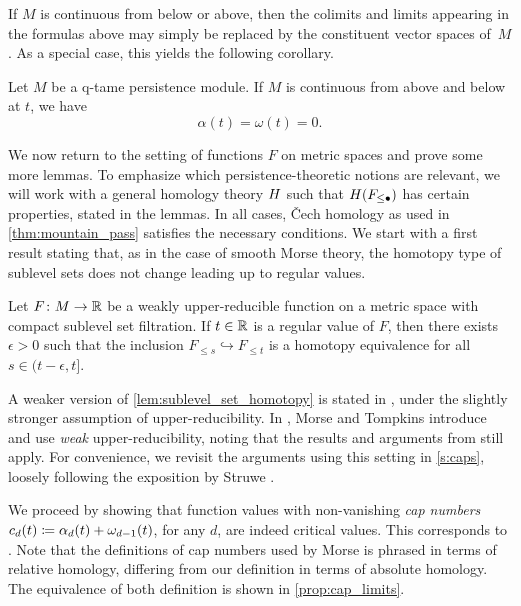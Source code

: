 If $M$ is continuous from below or above, then the colimits and limits appearing in the formulas above may simply be replaced by the constituent vector spaces of~$M$.
As a special case, this yields the following corollary.

\begin{cor}
\label{cor:regular_value_no_endpoint}
	Let $M$ be a q-tame persistence module.
	If $M$ is continuous from above and below at $t$, we have
	\[
		\alpha(t) = \omega(t) = 0.
	\]
\end{cor}

We now return to the setting of functions $F$ on metric spaces and prove some more lemmas.
To emphasize which persistence-theoretic notions are relevant, we will work with a general homology theory $H$ such that $H(F_{\leq \bullet})$ has certain properties, stated in the lemmas.
In all cases, \v{C}ech homology as used in \cref{thm:mountain_pass} satisfies the necessary conditions.
We start with a first result stating that, as in the case of smooth Morse theory, the homotopy type of sublevel sets does not change leading up to regular values.

\begin{lem}\label{lem:sublevel_set_homotopy}
	Let $F \colon M \to \mathbb{R}$ be a weakly upper-reducible function on a metric space with compact sublevel set filtration.
	If $t \in \mathbb{R}$ is a regular value of $F$, then there exists $\epsilon > 0$ such that the inclusion $F_{\leq s} \hookrightarrow F_{\leq t}$ is a homotopy equivalence for all $s \in (t - \epsilon, t]$.
\end{lem}

A weaker version of \cref{lem:sublevel_set_homotopy} is stated in \cite[Lemma 8.1]{Morse.1938}, under the slightly stronger assumption of upper-reducibility.
In \cite{Morse.1939}, Morse and Tompkins introduce and use \emph{weak} upper-reducibility, noting that the results and arguments from \cite[Sections 7 and 8]{Morse.1938} still apply.
For convenience, we revisit the arguments using this setting in \cref{s:caps}, loosely following the exposition by Struwe \cite[Remark II.6.3]{Struwe.1988}.

We proceed by showing that function values with non-vanishing \emph{cap numbers} $c_d(t) \coloneqq \alpha_d(t) + \omega_{d-1}(t)$, for any $d$, are indeed critical values.
This corresponds to \cite[Theorem 8.1]{Morse.1938}.
Note that the definitions of cap numbers used by Morse is phrased in terms of relative homology, differing from our definition in terms of absolute homology. The equivalence of both definition is shown in \cref{prop:cap_limits}.

